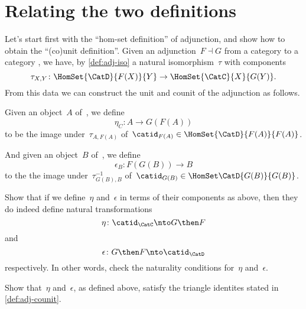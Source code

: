 \section{Relating the two definitions}
\label{relate-adj-defs}

Let's start first with the ``hom-set definition'' of adjunction, and show how to obtain the ``(co)unit definition''.
Given an adjunction~$F \dashv G$ from a category \CatC to a category \CatD, we have, by \cref{def:adj-iso} a natural isomorphism~$\tau$ with components
\begin{equation*}
  \tau_{X,Y} \colon \HomSet{\CatD}{F(X)}{Y} \to \HomSet{\CatC}{X}{G(Y)}.
\end{equation*}
From this data we can construct the unit and counit of the adjunction as follows.

Given an object~$A$ of~\CatC, we define
\begin{equation*}
  \eta_C \colon A \to G(F(A))
\end{equation*}
to be the image under~$\tau_{A, F(A)}$ of~$\catid_{F(A)} \in \HomSet{\CatD}{F (A)}{F(A)}$.

And given an object~$B$ of~\CatD, we define
\begin{equation*}
  \epsilon_B \colon F(G(B)) \to B
\end{equation*}
to the the image under~$\tau_{G(B), B}^{-1}$ of~$\catid_{G(B)} \in \HomSet\CatD{G(B)}{G(B)}$.

\begin{exercise}\label{ex:eta-epsilon}

  Show that if we define~$\eta$ and~$\epsilon$ in terms of their components as above, then they do indeed define natural transformations
  \begin{equation*}
    \eta\colon \catid_{\CatC} \nto G\then F
  \end{equation*}
  and
  \begin{equation*}
    \epsilon\colon G \then F \nto \catid_{\CatD}
  \end{equation*}
  respectively. In other words, check the naturality conditions for~$\eta$ and~$\epsilon$.
\end{exercise}
\begin{solution}
\end{solution}

\begin{exercise}\label{ex:eta-epsilon-triangle}
  Show that~$\eta$ and~$\epsilon$, as defined above, satisfy the triangle identites stated in \cref{def:adj-counit}.
\end{exercise}
\begin{solution}
\end{solution}

